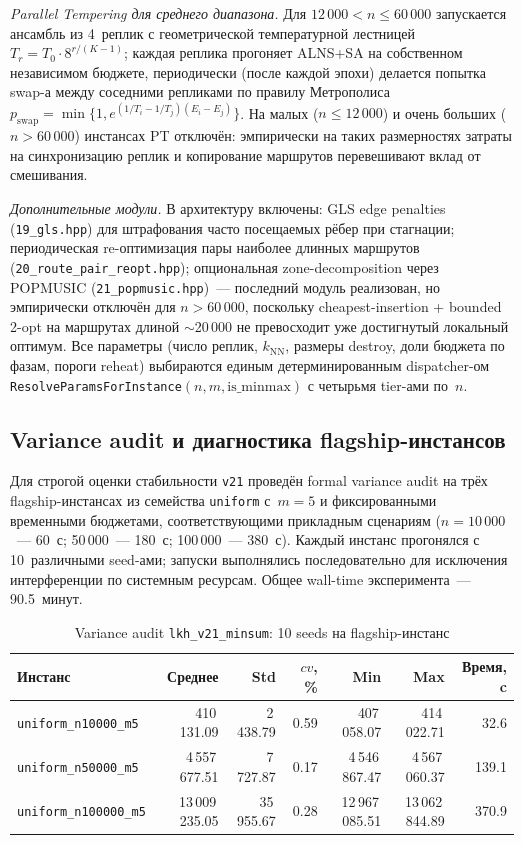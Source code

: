 \documentclass[14pt,a4paper]{extarticle}
\begin{document}
\textit{Parallel Tempering для среднего диапазона.} Для $12\,000 < n \leq 60\,000$ запускается ансамбль из 4~реплик с геометрической температурной лестницей $T_r = T_0 \cdot 8^{r/(K-1)}$; каждая реплика прогоняет ALNS+SA на собственном независимом бюджете, периодически (после каждой эпохи) делается попытка swap-а между соседними репликами по правилу Метрополиса $p_{\mathrm{swap}} = \min\{1, e^{(1/T_i - 1/T_j)(E_i - E_j)}\}$. На малых ($n \leq 12\,000$) и очень больших ($n > 60\,000$) инстансах PT отключён: эмпирически на таких размерностях затраты на синхронизацию реплик и копирование маршрутов перевешивают вклад от смешивания.

\textit{Дополнительные модули.} В архитектуру включены: GLS edge penalties (\texttt{19\_gls.hpp}) для штрафования часто посещаемых рёбер при стагнации; периодическая re-оптимизация пары наиболее длинных маршрутов (\texttt{20\_route\_pair\_reopt.hpp}); опциональная zone-decomposition через POPMUSIC (\texttt{21\_popmusic.hpp})~--- последний модуль реализован, но эмпирически отключён для $n > 60\,000$, поскольку cheapest-insertion + bounded 2-opt на маршрутах длиной $\sim$20\,000 не превосходит уже достигнутый локальный оптимум. Все параметры (число реплик, $k_{\mathrm{NN}}$, размеры destroy, доли бюджета по фазам, пороги reheat) выбираются единым детерминированным dispatcher-ом \texttt{ResolveParamsForInstance}$(n, m, \mathrm{is\_minmax})$ с четырьмя tier-ами по~$n$.

\subsection{Variance audit и диагностика flagship-инстансов}

Для строгой оценки стабильности \texttt{v21} проведён formal variance audit на трёх flagship-инстансах из семейства \texttt{uniform} с~$m=5$ и фиксированными временными бюджетами, соответствующими прикладным сценариям ($n=10\,000$~--- 60~с; 50\,000~--- 180~с; 100\,000~--- 380~с). Каждый инстанс прогонялся с 10~различными seed-ами; запуски выполнялись последовательно для исключения интерференции по системным ресурсам. Общее wall-time эксперимента~--- 90.5~минут.

\begin{table}[H]
\centering
\caption{Variance audit \texttt{lkh\_v21\_minsum}: 10 seeds на flagship-инстанс}
\small
\begin{tabular}{lrrrrrr}
\toprule
Инстанс & Среднее & Std & $cv$, \% & Min & Max & Время, c\\
\midrule
\texttt{uniform\_n10000\_m5}  &     410\,131.09 &   2\,438.79 & 0.59 &     407\,058.07 &     414\,022.71 &  32.6\\
\texttt{uniform\_n50000\_m5}  &  4\,557\,677.51 &   7\,727.87 & 0.17 &  4\,546\,867.47 &  4\,567\,060.37 & 139.1\\
\texttt{uniform\_n100000\_m5} & 13\,009\,235.05 &  35\,955.67 & 0.28 & 12\,967\,085.51 & 13\,062\,844.89 & 370.9\\
\bottomrule
\end{tabular}
\normalsize
\end{table}
\end{document}
